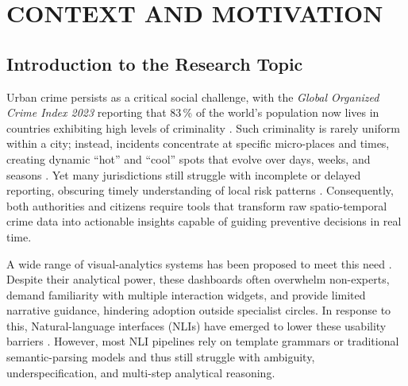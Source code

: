 \chapter{CONTEXT AND MOTIVATION} 


\section{Introduction to the Research Topic} %

Urban crime persists as a critical social challenge, with the \emph{Global Organized Crime Index 2023} reporting that 83\,\% of the world’s population now lives in countries exhibiting high levels of criminality \citep{GlobalCrimeIndex2023}.
Such criminality is rarely uniform within a city; instead, incidents concentrate at specific micro-places and times, creating dynamic “hot” and “cool” spots that evolve over days, weeks, and seasons \citep{Garcia2022CriPAV}.
Yet many jurisdictions still struggle with incomplete or delayed reporting, obscuring timely understanding of local risk patterns \citep{NSSFCrimeReporting2023}. Consequently, both authorities and citizens require tools that transform raw spatio-temporal crime data into actionable insights capable of guiding preventive decisions in real time.


A wide range of visual-analytics systems has been proposed to meet this need \citep{Garcia2022CriPAV, Salah2022BigCDVis, Silva2017CrimeVisAI, Garcia2020MiranteAV, Garcia2021CrimAnalyzer}. Despite their analytical power, these dashboards often overwhelm non-experts, demand familiarity with multiple interaction widgets, and provide limited narrative guidance, hindering adoption outside specialist circles. In response to this, Natural-language interfaces (NLIs) have emerged to lower these usability barriers \citep{Setlur2016Eviza, Narechania2021NL4DV, Luo2022NL2Vis, Liu2021ADVISor, Sah2024GeneratingAnalyticsDataVizLLMs}. However, most NLI pipelines rely on template grammars or traditional semantic-parsing models and thus still struggle with ambiguity, underspecification, and multi-step analytical reasoning.
 

